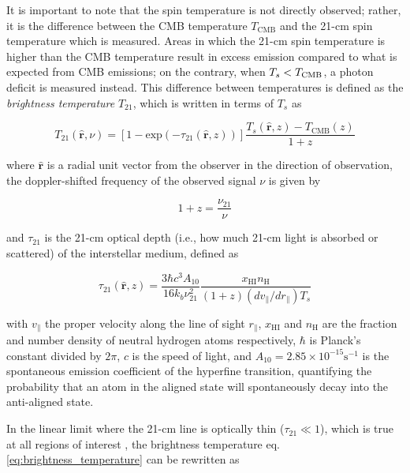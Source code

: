 \documentclass[floats,floatfix,showpacs,amssymb,prd,superscriptaddress,nofootinbib]{revtex4-2} %
\newcommand{\lt}{\ensuremath <}
\begin{document}
It is important to note that the spin temperature is not directly observed; rather, it is the difference between the CMB temperature $T_{\text{CMB}}$ and the 21-cm spin temperature which is measured. Areas in which the 21-cm spin temperature is higher than the CMB temperature result in excess emission compared to what is expected from CMB emissions; on the contrary, when $T_s \lt T_{\text{CMB}}$, a photon deficit is measured instead. This difference between temperatures is defined as the \textit{brightness temperature} $T_{21}$, which is written in terms of $T_s$ as \citep{Furlanetto_2006}

\begin{equation}
    T_{21} (\hat{\textbf{r}}, \nu) = \left[1 - \text{exp}(-\tau_{21}(\hat{\textbf{r}}, z)) \right] \frac{T_s(\hat{\textbf{r}}, z) - T_{\text{CMB}} (z)}{1 + z}
    \label{eq:brightness_temperature}
\end{equation}

\noindent where $\hat{\textbf{r}}$ is a radial unit vector from the observer in the direction of observation, the doppler-shifted frequency of the observed signal $\nu$ is given by

\begin{equation}
    1 + z = \frac{\nu_{21}}{\nu}
\end{equation}

\noindent and $\tau_{21}$ is the 21-cm optical depth (i.e., how much 21-cm light is absorbed or scattered) of the interstellar medium, defined as 

\begin{equation}
    \tau_{21} (\hat{\textbf{r}}, z) = \frac{3 \hbar c^3 A_{10}}{16 k_b \nu^2_{21}} \frac{x_{\mathrm{HI}} n_\mathrm{H}}{(1 + z) (dv_{\parallel} / dr_{\parallel}) T_s}
    \label{eq:optical_depth}
\end{equation}

\noindent with $v_\parallel$ the proper velocity along the line of sight $r_\parallel$, $x_{\mathrm{HI}}$ and $n_{\mathrm{H}}$ are the fraction and number density of neutral hydrogen atoms respectively, $\hbar$ is Planck's constant divided by $2\pi$, $c$ is the speed of light, and $A_{10} = 2.85 \times 10^{-15} \text{s}^{-1}$ is the spontaneous emission coefficient of the hyperfine transition, quantifying the probability that an atom in the aligned state will spontaneously decay into the anti-aligned state. 

In the linear limit where the 21-cm line is optically thin ($\tau_{21} \ll 1$), which is true at all regions of interest \citep{Lewis_Challinor_2007}, the brightness temperature eq. \ref{eq:brightness_temperature} can be rewritten as \citep{Pritchard_Loeb_2012}
\end{document}
